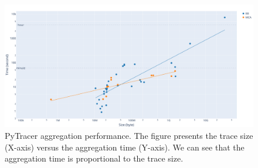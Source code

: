 \documentclass[11pt]{article}
\newcommand{\pytracer}[0]{PyTracer\xspace}
\begin{document}
\begin{figure}
    \centering
    \includegraphics[width=\linewidth]{figure/parsing_time.pdf}
    \caption{\pytracer aggregation performance. The figure presents
    the trace size (X-axis) versus the aggregation time (Y-axis).
    We can see that the aggregation time is proportional to the trace size.}
    \label{fig:performance_parsing}
\end{figure}
\end{document}
